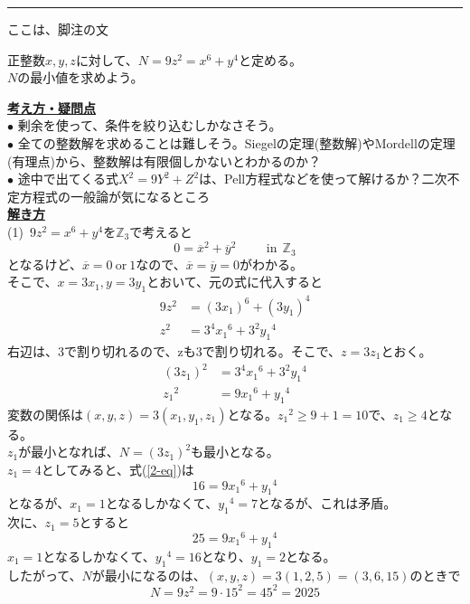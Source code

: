 \documentclass[11pt]{article}
\begin{document}
\vfill
\hrule
\vspace{1mm}
{\footnotesize ここは、脚注の文}

\newpage

\begin{tcolorbox}[mybox={問２}]
正整数$x,y,z$に対して、$N=9z^2 = x^6 + y^4$と定める。\\
$N$の最小値を求めよう。
\end{tcolorbox}

\underline{\textbf{考え方・疑問点}}\\
$\bullet$ 剰余を使って、条件を絞り込むしかなさそう。\\
$\bullet$ 全ての整数解を求めることは難しそう。Siegelの定理(整数解)やMordellの定理(有理点)から、整数解は有限個しかないとわかるのか？\\
$\bullet$ 途中で出てくる式$X^2 = 9Y^2 + Z^2$は、Pell方程式などを使って解けるか？二次不定方程式の一般論が気になるところ\\

\underline{\textbf{解き方}}\\
(1)\ $9z^2 = x^6 + y^4$を$\mathbb{Z}_3$で考えると
\begin{equation*}
0= \overline{x}^2 + \overline{y}^2 \hspace{1cm} \mathrm{in} \ \ \mathbb{Z}_3
\end{equation*}
となるけど、$\overline{x} = 0\ \mathrm{or} \ 1$なので、$\overline{x}=\overline{y}=0$がわかる。\\
そこで、$x=3x_1 , y=3y_1$とおいて、元の式に代入すると\\
\begin{align*}
9z^2 &= {(3x_1)}^6 + {(3y_1)}^4\\
z^2 &= 3^4 {x_1}^6 + 3^2 {y_1}^4
\end{align*}
右辺は、3で割り切れるので、zも3で割り切れる。そこで、$z=3z_1$とおく。
\begin{align}
{(3z_1)}^2 &= 3^4 {x_1}^6 + 3^2 {y_1}^4 \nonumber \\
{z_1}^2 &= 9 {x_1}^6 + {y_1}^4 \label{2-eq}
\end{align}
変数の関係は$(x,y,z)=3(x_1 , y_1 , z_1)$となる。${z_1}^2 \geq 9+1 =10$で、$z_1 \geq 4$となる。\\
$z_1$が最小となれば、$N={(3z_1)}^2$も最小となる。\\
$z_1 = 4$としてみると、式(\ref{2-eq})は
\begin{equation*}
16 = 9 {x_1}^6 + {y_1}^4
\end{equation*}
となるが、$x_1=1$となるしかなくて、${y_1}^4 =7$となるが、これは矛盾。\\
次に、$z_1 = 5$とすると
\begin{equation*}
25 = 9 {x_1}^6 + {y_1}^4
\end{equation*}
$x_1=1$となるしかなくて、${y_1}^4 = 16$となり、$y_1=2$となる。\\
したがって、$N$が最小になるのは、$(x,y,z)=3(1,2,5)=(3,6,15)$のときで
\begin{equation*}
N=9z^2=9 \cdot 15^2 = 45^2 =2025
\end{equation*}

\newpage
\end{document}
